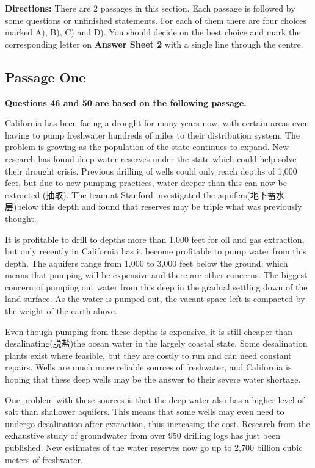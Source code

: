 \documentclass[UTF8,11pt]{ctexart}
\begin{document}
\textbf{Directions:} There are 2 passages in this section. Each passage is followed by some questions or unfinished statements. For each of them there are four choices marked A), B), C) and D). You should decide on the best choice and mark the corresponding letter on\textbf{ Answer Sheet 2} with a single line through the centre.


\subsection*{\textbf{Passage One}}


\textbf{Questions 46 and 50 are based on the following passage.}


California has been facing a drought for many years now, with certain areas even having to pump freshwater hundreds of miles to their distribution system. The problem is growing as the population of the state continues to expand. New research has found deep water reserves under the state which could help solve their drought crisis. Previous drilling of wells could only reach depths of 1,000 feet, but due to new pumping practices, water deeper than this can now be extracted (抽取). The team at Stanford investigated the aquifers(地下蓄水层)below this depth and found that reserves may be triple what was previously thought.


It is profitable to drill to depths more than 1,000 feet for oil and gas extraction, but only recently in California has it become profitable to pump water from this depth. The aquifers range from 1,000 to 3,000 feet below the ground, which means that pumping will be expensive and there are other concerns. The biggest concern of pumping out water from this deep in the gradual settling down of the land surface. As the water is pumped out, the vacant space left is compacted by the weight of the earth above.


Even though pumping from these depths is expensive, it is still cheaper than desalinating(脱盐)the ocean water in the largely coastal state. Some desalination plants exist where feasible, but they are costly to run and can need constant repairs. Wells are much more reliable sources of freshwater, and California is hoping that these deep wells may be the answer to their severe water shortage.


One problem with these sources is that the deep water also has a higher level of salt than shallower aquifers. This means that some wells may even need to undergo desalination after extraction, thus increasing the cost. Research from the exhaustive study of groundwater from over 950 drilling logs has just been published. New estimates of the water reserves now go up to 2,700 billion cubic meters of freshwater.
\end{document}
